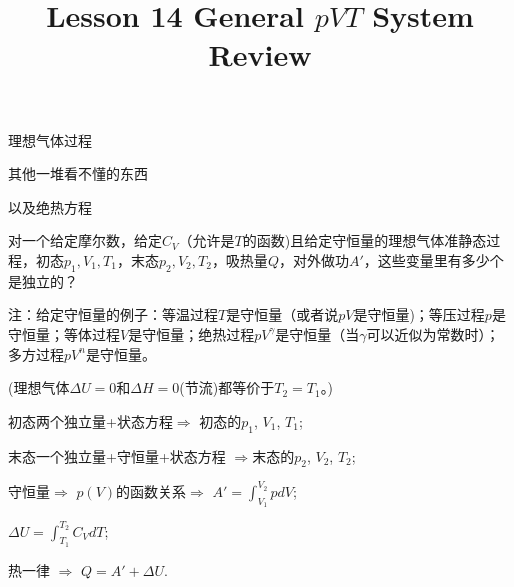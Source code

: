 \documentclass[CJK]{beamer}
\title{Lesson 14 General $pVT$ System Review}
\author{}
\date{}
\begin{document}


\begin{frame}
  \bch
  \bitem
\item{理想气体过程}
\item{其他一堆看不懂的东西}
  \eitem
  \ech
\end{frame}

\begin{frame}
  \bch
  以及绝热方程
  \ech
\end{frame}

\begin{frame}
  \bch
  对一个给定摩尔数，给定$C_V$（允许是$T$的函数)且给定守恒量的理想气体准静态过程，初态$p_1, V_1, T_1$，末态$p_2, V_2, T_2$，吸热量$Q$，对外做功$A'$，这些变量里有多少个是独立的？

  \skipline

  {\scriptsize 注：给定守恒量的例子：等温过程$T$是守恒量（或者说$pV$是守恒量)；等压过程$p$是守恒量；等体过程$V$是守恒量；绝热过程$pV^\gamma$是守恒量（当$\gamma$可以近似为常数时）；多方过程$pV^n$是守恒量。}
  \ech
\end{frame}



\begin{frame}
  \bch
  
  {\scriptsize (理想气体$\Delta U = 0$和$\Delta H=0$(节流)都等价于$T_2=T_1$。)}
  
  
  \bitem
  \item{初态两个独立量+状态方程$\Rightarrow$ 初态的$p_1$, $V_1$, $T_1$;}
  \item{末态一个独立量+守恒量+状态方程 $\Rightarrow$末态的$p_2$, $V_2$, $T_2$;}
  \item{守恒量$\Rightarrow$ $p(V)$的函数关系$\Rightarrow$ $A' = \int_{V_1}^{V_2} pdV$;}
  \item{$\Delta U = \int_{T_1}^{T_2} C_VdT$;}
  \item{热一律 $\Rightarrow$ $Q = A'+\Delta U$.}
    \eitem

  \ech
\end{frame}
\end{document}
